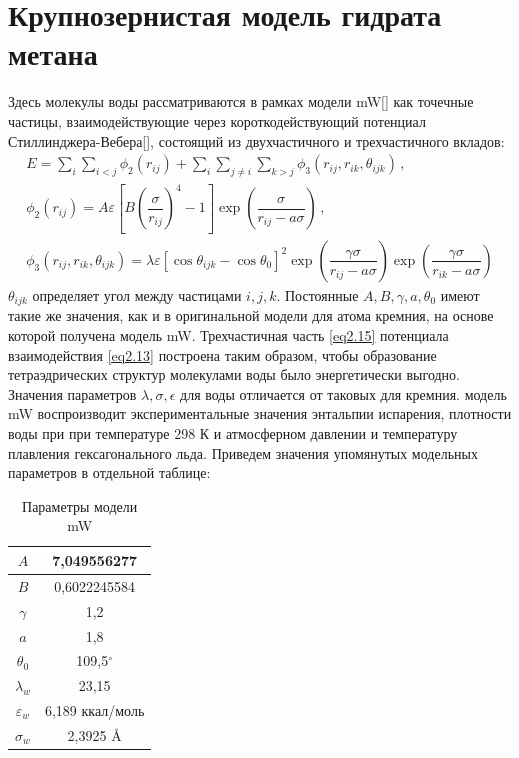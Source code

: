 \section{Крупнозернистая модель гидрата метана}
Здесь молекулы воды рассматриваются в рамках модели mW[] как точечные частицы, взаимодействующие через короткодействующий потенциал Стиллинджера-Вебера[], состоящий из двухчастичного и трехчастичного вкладов:
\begin{gather}
    E = \sum\limits_{i}\sum\limits_{i<j}\phi_2(r_{ij}) + \sum\limits_{i}\sum\limits_{j\neq i}\sum\limits_{k>j}\phi_3(r_{ij},r_{ik},\theta_{ijk})\,, \label{eq2.13} \\
    \phi_2(r_{ij}) = A\varepsilon\left[B\left(\dfrac{\sigma}{r_{ij}}\right)^4 -1\right]\exp\left(\dfrac{\sigma}{r_{ij}-a\sigma}\right)\,,
    \label{eq2.14} \\
    \phi_3(r_{ij},r_{ik},\theta_{ijk}) = \lambda\varepsilon{[\cos{\theta_{ijk}}-\cos{\theta_0}]}^2\exp{\left(\dfrac{\gamma\sigma}{r_{ij}-a\sigma}\right)}\exp{\left(\dfrac{\gamma\sigma}{r_{ik}-a\sigma}\right)}
    \label{eq2.15}
\end{gather}
$\theta_{ijk}$ определяет угол между частицами $i,j,k$. Постоянные $A, B, \gamma, a, \theta_0$ имеют такие же значения, как и в оригинальной модели для атома кремния, на основе которой получена модель mW. Трехчастичная часть \eqref{eq2.15} потенциала взаимодействия \eqref{eq2.13} построена таким образом, чтобы образование тетраэдрических структур молекулами воды было энергетически выгодно. Значения параметров $\lambda, \sigma, \epsilon$ для воды отличается от таковых для кремния. модель mW воспроизводит экспериментальные значения энтальпии испарения, плотности воды при при температуре 298 К и атмосферном давлении и температуру плавления гексагонального льда. Приведем значения упомянутых модельных параметров в отдельной таблице:

\begin{table}[H]
    \centering
    \caption{Параметры модели mW}
    \renewcommand{\arraystretch}{1.5}
    \begin{tabular}{c|c}
        $A$             & 7,049556277       \\ \hline
        $B$             & 0,6022245584      \\ \hline
        $\gamma$        & 1,2               \\ \hline
        $a$             & 1,8               \\ \hline
        $\theta_0$      & 109,5$^{\circ}$   \\ \hline
        $\lambda_w$       & 23,15             \\ \hline
        $\varepsilon_w$ & 6,189 ккал/моль   \\ \hline
        $\sigma_w$      & 2,3925 $\si{\angstrom}$
        \end{tabular}
    \label{table3}
\end{table}

